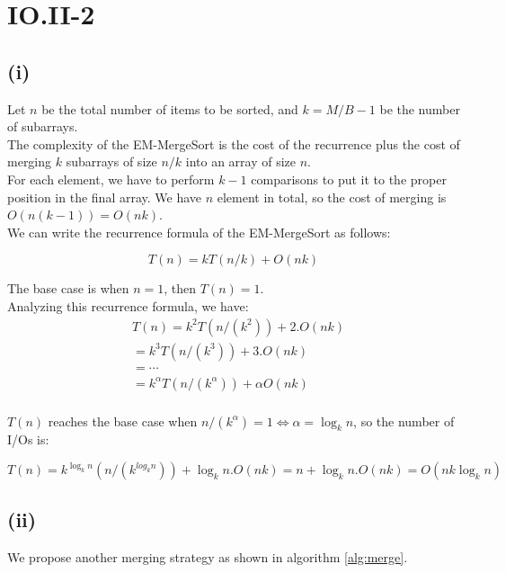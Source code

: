 \section*{IO.II-2}
\subsection*{(i)}
Let $n$ be the total number of items to be sorted, and $k = M/B - 1$ be the number of subarrays.\\

The complexity of the EM-MergeSort is the cost of the recurrence plus the cost of merging $k$ subarrays of size $n/k$ into an array of size $n$. \\ 

For each element, we have to perform $k-1$ comparisons to put it to the proper position in the final array. We have $n$ element in total, so the cost of merging is $O(n(k - 1)) = O(nk)$.\\

We can write the recurrence formula of the EM-MergeSort as follows:

$$T(n) = kT(n/k) + O(nk)$$

The base case is when $n = 1$, then $T(n) = 1$.\\

Analyzing this recurrence formula, we have:\\

\begin{equation*}
\begin{aligned}
&T(n) = k^2T(n/(k^2)) + 2.O(nk) \\
&= k^3T(n/(k^3)) + 3.O(nk) \\
&= \cdots \\
&= k^\alpha T(n/(k^\alpha)) + \alpha O(nk) \\
\end{aligned}
\end{equation*}


$T(n)$ reaches the base case when $n/(k^\alpha) = 1 \iff \alpha = \log_k n$, so the number of I/Os is:

$$T(n) = k^{\log_k n} (n/(k^{log_k n})) + \log_k n.O(nk) = n + \log_k n.O(nk) = O(nk\log_k n)$$

\subsection*{(ii)}
We propose another merging strategy as shown in algorithm \ref{alg:merge}.

